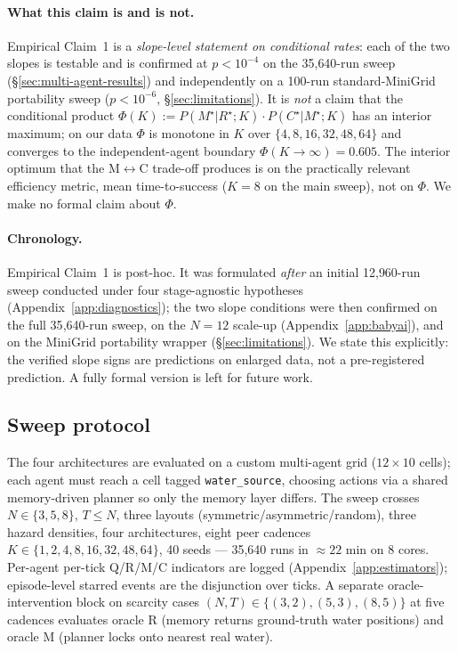 \documentclass{article}
\begin{document}
\paragraph{What this claim is and is not.}
Empirical Claim~1 is a \emph{slope-level statement on conditional rates}: each of the two slopes is testable and is confirmed at $p<10^{-4}$ on the 35{,}640-run sweep (\S\ref{sec:multi-agent-results}) and independently on a 100-run standard-MiniGrid portability sweep ($p<10^{-6}$, \S\ref{sec:limitations}). It is \emph{not} a claim that the conditional product $\Phi(K) := P(M^\star|R^\star;K)\!\cdot\! P(C^\star|M^\star;K)$ has an interior maximum; on our data $\Phi$ is monotone in $K$ over $\{4,8,16,32,48,64\}$ and converges to the independent-agent boundary $\Phi(K\!\to\!\infty){=}0.605$. The interior optimum that the M$\leftrightarrow$C trade-off produces is on the practically relevant efficiency metric, mean time-to-success ($K{=}8$ on the main sweep), not on $\Phi$. We make no formal claim about $\Phi$.

\paragraph{Chronology.}
Empirical Claim~1 is post-hoc. It was formulated \emph{after} an initial 12{,}960-run sweep conducted under four stage-agnostic hypotheses (Appendix~\ref{app:diagnostics}); the two slope conditions were then confirmed on the full 35{,}640-run sweep, on the $N\!=\!12$ scale-up (Appendix~\ref{app:babyai}), and on the MiniGrid portability wrapper (\S\ref{sec:limitations}). We state this explicitly: the verified slope signs are predictions on enlarged data, not a pre-registered
prediction. A fully formal version is left for future work.

\subsection{Sweep protocol}
\label{sec:multi-agent-protocol}

The four architectures are evaluated on a custom multi-agent grid ($12{\times}10$ cells); each agent must reach a cell tagged \texttt{water\_source}, choosing actions via a shared memory-driven planner so only the memory layer differs. The sweep crosses $N{\in}\{3,5,8\}$, $T{\le}N$, three layouts (symmetric/asymmetric/random), three hazard densities, four architectures, eight peer cadences $K{\in}\{1,2,4,8,16,32,48,64\}$, 40 seeds --- 35{,}640 runs in $\approx 22$ min on 8 cores. Per-agent per-tick Q/R/M/C indicators are logged (Appendix~\ref{app:estimators}); episode-level starred events are the disjunction over ticks. A separate oracle-intervention block on scarcity cases $(N,T){\in}\{(3,2),(5,3),(8,5)\}$ at five cadences evaluates oracle R (memory returns ground-truth water positions) and oracle M (planner locks onto nearest real water).
\end{document}
